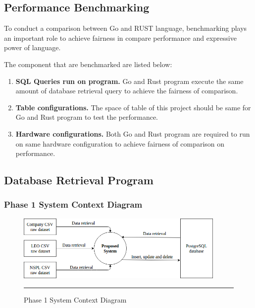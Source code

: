 \subsection{Performance Benchmarking}

To conduct a comparison between Go and RUST language, benchmarking plays an important role to achieve fairness in compare performance and expressive power of language.

The component that are benchmarked are listed below:  

\begin{enumerate}[topsep=0pt,itemsep=-1ex,partopsep=1ex,parsep=1.5ex]
	
	\item \textbf{SQL Queries run on program. } Go and Rust program execute the same amount of database retrieval query to achieve the fairness of comparison.
	\newline
	\item \textbf{Table configurations.} The space of table of this project should be same for Go and Rust program to test the performance. 
	\newline
	\item \textbf{Hardware configurations. } Both Go and Rust program are required to run on same hardware configuration to achieve fairness of comparison on performance.
	\newline
	
\end{enumerate}

\pagebreak

\subsection{Database Retrieval Program}

\subsubsection{Phase 1 System Context Diagram}

\begin{figure}[H]
	\centering
	\includegraphics[width=0.9\textwidth]{Figure/fyp-context.png}
	\rule{35em}{0.5pt}
	\caption[Phase 1 System Context Diagram]{Phase 1 System Context Diagram}
\end{figure}

